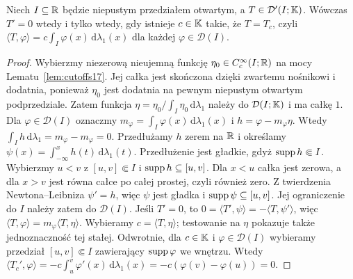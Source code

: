 \begin{twierdzenie}
\label{thm:zero-derivative20}
Niech $I\subseteq\mathbb R$ będzie niepustym przedziałem otwartym,
a $T\in\mathcal D'(I;\mathbb K)$. Wówczas $T'=0$
wtedy i tylko wtedy, gdy istnieje $c\in\mathbb K$ takie, że
$T=T_c$, czyli
$\langle T,\varphi\rangle=c\int_I\varphi(x)\,\mathrm d\lambda_1(x)$
dla każdej $\varphi\in\mathcal D(I)$.
\end{twierdzenie}
\begin{proof}
Wybierzmy niezerową nieujemną funkcję
$\eta_0\in C_c^\infty(I;\mathbb R)$ na mocy
Lematu~\ref{lem:cutoffs17}. Jej całka jest skończona
dzięki zwartemu nośnikowi i dodatnia, ponieważ $\eta_0$
jest dodatnia na pewnym niepustym otwartym podprzedziale.
Zatem
funkcja $\eta=\eta_0/\int_I\eta_0\,\mathrm d\lambda_1$
należy do $\mathcal D(I;\mathbb K)$ i ma całkę $1$.
Dla $\varphi\in\mathcal D(I)$ oznaczmy
$m_\varphi=\int_I\varphi(x)\,\mathrm d\lambda_1(x)$
i $h=\varphi-m_\varphi\eta$. Wtedy
$\int_I h\,\mathrm d\lambda_1=m_\varphi-m_\varphi=0$.
Przedłużamy $h$ zerem na $\mathbb R$ i określamy
$\psi(x)=\int_{-\infty}^xh(t)\,\mathrm d\lambda_1(t)$.
Przedłużenie jest gładkie, gdyż $\operatorname{supp} h\Subset I$.
Wybierzmy $u<v$ z $[u,v]\Subset I$ i
$\operatorname{supp} h\subseteq[u,v]$. Dla $x<u$ całka jest zerowa,
a dla $x>v$ jest równa całce po całej prostej, czyli również
zero. Z twierdzenia Newtona--Leibniza $\psi'=h$,
więc $\psi$ jest gładka i $\operatorname{supp}\psi\subseteq[u,v]$.
Jej ograniczenie do $I$ należy zatem do $\mathcal D(I)$. Jeśli $T'=0$, to
$0=\langle T',\psi\rangle=-\langle T,\psi'\rangle$,
więc $\langle T,\varphi\rangle=m_\varphi\langle T,\eta\rangle$.
Wybieramy $c=\langle T,\eta\rangle$; testowanie na $\eta$
pokazuje także jednoznaczność tej stałej.
Odwrotnie, dla $c\in\mathbb K$ i $\varphi\in\mathcal D(I)$
wybieramy przedział $[u,v]\Subset I$ zawierający
$\operatorname{supp}\varphi$ we wnętrzu. Wtedy
$\langle T_c',\varphi\rangle=-c\int_u^v\varphi'(x)\,
\mathrm d\lambda_1(x)=-c(\varphi(v)-\varphi(u))=0$.
\end{proof}

